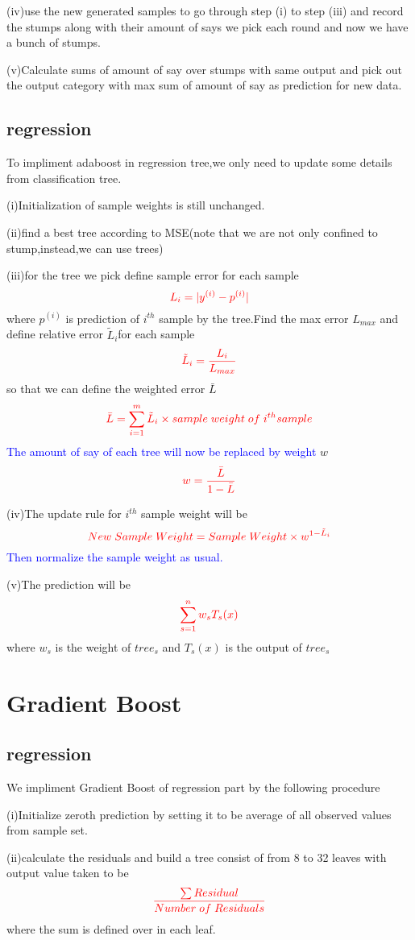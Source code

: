 \documentclass{article}
\begin{document}
(iv)use the new generated samples to go through step (i) to step (iii) and record the stumps along with their amount of says we pick each round and now we have a bunch of stumps.

(v)Calculate sums of amount of say over stumps with same output and pick out the output category with max sum of amount of say as prediction for new data.
\subsection{regression}
To impliment adaboost in regression tree,we only need to update some details from classification tree.

(i)Initialization of sample weights is still unchanged.

(ii)find a best tree according to MSE(note that we are not only confined to stump,instead,we can use trees)

(iii)for the tree we pick define sample error for each sample$$\textcolor{red}{L_i=|y^{(i)}-p^{(i)}|}$$where $p^{(i)}$ is prediction of  $i^{th}$ sample by the tree.Find the max error $L_{max}$ and define relative error $\tilde{L}_i$for each sample$$\textcolor{red}{\tilde{L}_i=\frac{L_i}{L_{max}}}$$so that we can define the weighted error $\bar{L}$ $$\textcolor{red}{\bar{L}=\sum_{i=1}^{m}\tilde{L}_i\times sample\;weight\;of\;i^{th}sample}$$ \textcolor{blue}{The amount of say of each tree will now be replaced by weight} $w$ $$\textcolor{red}{w=\frac{\bar{L}}{1-\bar{L}}}$$

(iv)The update rule for $i^{th}$ sample weight will be $$\textcolor{red}{New\;Sample\;Weight=Sample\;Weight\times w^{1-\tilde{L}_i}}$$
\textcolor{blue}{Then normalize the sample weight as usual.}

(v)The prediction will be$$\textcolor{red}{\sum_{s=1}^{n}w_s T_s(x)}$$where $w_s$ is the weight of $tree_s$ and $T_s(x)$ is the output of $tree_s$
\section{Gradient Boost}
\subsection{regression}
We impliment Gradient Boost of regression part by the following procedure

(i)Initialize zeroth prediction by setting it to be average of all observed values from sample set.

(ii)calculate the residuals and build a tree consist of from 8 to 32 leaves with output value taken to be$$\textcolor{red}{\frac{\sum Residual}{Number\;of\;Residuals}}$$where the sum is defined over in each leaf.
\end{document}
